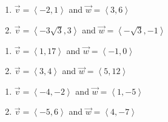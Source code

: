 \begin{multicols}{2} 

\begin{enumerate}

\setcounter{enumi}{\value{HW}}

\item $\vec{v} = \left\langle -2,1 \right\rangle$ and $\vec{w} = \left\langle 3,6 \right\rangle$
\item $\vec{v} = \left\langle -3\sqrt{3}, 3\right\rangle$ and $\vec{w} = \left\langle -\sqrt{3}, -1 \right\rangle$

\setcounter{HW}{\value{enumi}}

\end{enumerate}

\end{multicols}

\begin{multicols}{2} 

\begin{enumerate}

\setcounter{enumi}{\value{HW}}

\item $\vec{v} = \left\langle 1, 17 \right\rangle$ and $\vec{w} = \left\langle -1, 0 \right\rangle$
\item $\vec{v} = \left\langle 3, 4 \right\rangle$ and $\vec{w} = \left\langle 5, 12 \right\rangle$

\setcounter{HW}{\value{enumi}}

\end{enumerate}

\end{multicols}

\begin{multicols}{2} 

\begin{enumerate}

\setcounter{enumi}{\value{HW}}

\item $\vec{v} = \left\langle -4, -2 \right\rangle$ and $\vec{w} = \left\langle 1, -5 \right\rangle$
\item $\vec{v} = \left\langle -5, 6 \right\rangle$ and $\vec{w} = \left\langle 4, -7 \right\rangle$

\setcounter{HW}{\value{enumi}}

\end{enumerate}

\end{multicols}

